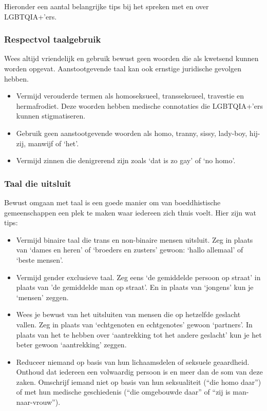\documentclass[12pt,openany]{book}
\begin{document}
Hieronder een aantal belangrijke tips bij het spreken met en over LGBTQIA+’ers.

\subsubsection*{Respectvol taalgebruik}

Wees altijd vriendelijk en gebruik bewust geen woorden die als kwetsend kunnen worden opgevat. Aanstootgevende taal kan ook ernstige juridische gevolgen hebben.

\begin{itemize}
  \setlength\itemsep{-0.3em}
  \item Vermijd verouderde termen als homoseksueel, transseksueel, travestie en hermafrodiet. Deze woorden hebben medische connotaties die LGBTQIA+’ers kunnen stigmatiseren.
  \item Gebruik geen aanstootgevende woorden als homo, tranny, sissy, lady-boy, hij-zij, manwijf of ‘het’.
  \item Vermijd zinnen die denigrerend zijn zoals ‘dat is zo gay’ of ‘no homo’.
\end{itemize}

\subsubsection*{Taal die uitsluit}

Bewust omgaan met taal is een goede manier om van boeddhistische gemeenschappen een plek te maken waar iedereen zich thuis voelt.  Hier zijn wat tips:

\begin{itemize}
  \setlength\itemsep{-0.3em}
  \item Vermijd binaire taal die trans en non-binaire mensen uitsluit. Zeg in plaats van ‘dames en heren’ of ‘broeders en zusters’ gewoon: ‘hallo allemaal’ of ‘beste mensen’.
  \item Vermijd gender exclusieve taal. Zeg eens ‘de gemiddelde persoon op straat’ in plaats van ’de gemiddelde man op straat’. En in plaats van ‘jongens’ kun je ‘mensen’ zeggen.
  \item Wees je bewust van het uitsluiten van mensen die op hetzelfde geslacht vallen. Zeg in plaats van ‘echtgenoten en echtgenotes’ gewoon ‘partners’. In plaats van het te hebben over ‘aantrekking tot het andere geslacht’ kun je het beter gewoon ‘aantrekking’ zeggen.
\item Reduceer niemand op basis van hun lichaamsdelen of seksuele geaardheid. Onthoud dat iedereen een volwaardig persoon is en meer dan de som van deze zaken. Omschrijf iemand niet op basis van hun seksualiteit (“die homo daar”) of met hun medische geschiedenis (“die omgebouwde daar” of “zij is man-naar-vrouw”).
\end{itemize}
\end{document}
